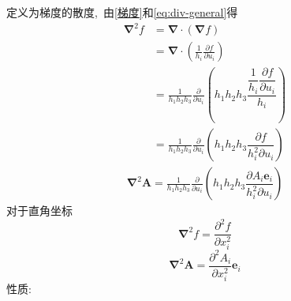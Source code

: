 定义为梯度的散度, \,由\ref{梯度}和\ref{eq:div-general}得
\begin{align}
    \boldsymbol{\nabla}^2f&=\boldsymbol{\nabla}\cdot(\boldsymbol{\nabla}f)\nonumber\\
    &=\boldsymbol{\nabla}\cdot\left(\frac{1}{h_i}\frac{\partial f}{\partial u_i}\right)\nonumber\\
    &=\frac{1}{h_1 h_2 h_3}\frac{\partial}{\partial u_i}\left(h_1 h_2 h_3\dfrac{\dfrac{1}{h_i}\dfrac{\partial f}{\partial u_i}}{h_i}\right)\nonumber\\
    &=\frac{1}{h_1 h_2 h_3}\frac{\partial}{\partial u_i}\left(h_1 h_2 h_3\dfrac{{\partial f}}{h_i^2\partial u_i}\right)
\end{align}
\begin{align}
    \boldsymbol{\nabla}^2\boldsymbol{A}
    =\frac{1}{h_1 h_2 h_3}\frac{\partial}{\partial u_i}\left(h_1 h_2 h_3\dfrac{{\partial A_i\boldsymbol{e}_i}}{h_i^2\partial u_i}\right)
\end{align}
对于直角坐标
\begin{equation}
    \boldsymbol{\nabla}^2f=\frac{\partial^2f}{\partial x_i^2}
\end{equation}
\begin{equation}
    \boldsymbol{\nabla}^2\boldsymbol{A}
    =\dfrac{{\partial^2 A_i}}{\partial x_i^2}\boldsymbol{e}_i
\end{equation}
性质:
